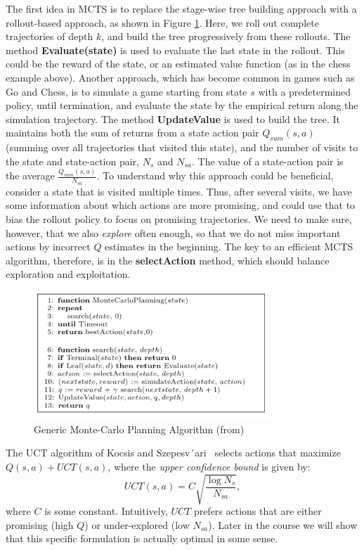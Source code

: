 The first idea in MCTS is to replace the stage-wise tree building approach with a rollout-based approach, as shown in Figure \ref{fig:mcts}. Here, we roll out complete trajectories of depth $k$, and build the tree progressively from these rollouts. The method \textbf{Evaluate(state)} is used to evaluate the last state in the rollout. This could be the reward of the state, or an estimated value function (as in the chess example above). Another approach, which has become common in games such as Go and Chess, is to simulate a game starting from state $s$ with a predetermined policy, until termination, and evaluate the state by the empirical return along the simulation trajectory.
The method \textbf{UpdateValue} is used to build the tree. It maintains both the sum of returns from a state action pair $Q_{sum}(s,a)$ (summing over all trajectories that visited this state), and the number of visits to the state and state-action pair, $N_s$ and $N_{sa}$. The value of a state-action pair is the average $\frac{Q_{sum}(s,a)}{N_{sa}}$. To understand why this approach could be beneficial, consider a state that is visited multiple times. Thus, after several visits, we have some information about which actions are more promising, and could use that to bias the rollout policy to focus on promising trajectories. We need to make sure, however, that we also \emph{explore} often enough, so that we do not miss important actions by incorrect $Q$ estimates in the beginning.
The key to an efficient MCTS algorithm, therefore, is in the \textbf{selectAction} method, which should balance exploration and exploitation.

\begin{figure}[h]
    \centering
    \includegraphics[width=0.8\textwidth]{figures/uct.png}
    \caption{Generic Monte-Carlo Planning Algorithm (from\cite{kocsis2006bandit})}
    \label{fig:mcts}
\end{figure}

The UCT algorithm of Kocsis and Szepesv´ari~\cite{kocsis2006bandit} selects actions that maximize $Q(s,a) + UCT(s,a)$, where the \emph{upper confidence bound} is given by: 
$$
UCT(s,a) = C \sqrt{\frac{\log N_s}{N_{sa}}},
$$
where $C$ is some constant. Intuitively, $UCT$ prefers actions that are either promising (high $Q$) or under-explored (low $N_{sa}$). Later in the course we will show that this specific formulation is actually optimal in some sense.

